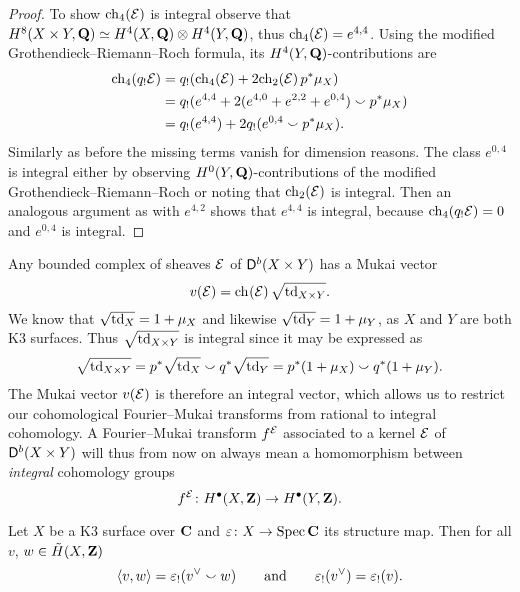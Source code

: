 \begin{proof}
    To show $\ch[4]{\E}$ is integral observe that $H^8(X \times Y, \mathbf Q) \simeq H^4(X, \mathbf Q) \otimes H^4(Y, \mathbf Q)$, thus $\ch[4]{\E} = e^{4,4}$. Using the modified Grothendieck--Riemann--Roch formula, its $H^4(Y, \mathbf Q)$-contributions are
    \begin{align*}
        \ch[4]{q_!\E} &= q_!(\ch[4]{\E} + 2\ch[2]{\E}p^*\mu_X) \\
        &= q_!(e^{4,4} + 2(e^{4,0} + e^{2,2} + e^{0,4})\smallsmile p^*\mu_X) \\
        &= q_!(e^{4,4}) + 2q_!(e^{0,4} \smallsmile p^*\mu_X).
    \end{align*}
    Similarly as before the missing terms vanish for dimension reasons. The class $e^{0,4}$ is integral either by observing $H^0(Y, \mathbf Q)$-contributions of the modified Grothendieck--Riemann--Roch or noting that $\ch[2]{\E}$ is integral. Then an analogous argument as with $e^{4,2}$ shows that $e^{4,4}$ is integral, because $\ch[4]{q_!\E} = 0$ and $e^{0,4}$ is integral. 
\end{proof}

\begin{remark}
    \label{Remark for rational to integral fm restriction}
    Any bounded complex of sheaves $\mathcal E$ of $\mathsf{D}^b(X \times Y)$ has a Mukai vector
    \[
        v(\E) = \ch[]{\E}\sqrt{\tdclass{X \times Y}}.
    \]
    We know that $\sqrt{\operatorname{td}_{X}} = 1 + \mu_X$ and likewise $\sqrt{\operatorname{td}_{Y}} = 1 + \mu_Y$, as $X$ and $Y$ are both K3 surfaces. Thus $\sqrt{\operatorname{td}_{X \times Y}}$ is integral since it may be expressed as
    \[
        \sqrt{\operatorname{td}_{X \times Y}} = p^*\sqrt{\operatorname{td}_{X}} \smallsmile q^*\sqrt{\operatorname{td}_{Y}} = p^*(1 + \mu_X) \smallsmile q^*(1 + \mu_Y).
    \]
    The Mukai vector $v(\mathcal E)$ is therefore an integral vector, which allows us to restrict our cohomological Fourier--Mukai transforms from rational to integral cohomology. A Fourier--Mukai transform $f^{\mathcal E}$ associated to a kernel $\mathcal E$ of $\mathsf{D}^b(X \times Y)$ will thus from now on always mean a homomorphism between \emph{integral} cohomology groups
    \[
        f^{\mathcal E} \colon H^{\bullet}(X, \mathbf Z) \to H^{\bullet}(Y, \mathbf Z).
    \] 
\end{remark}

\begin{lemma}
    \label{Intersection pairing through push-forward of structure map}
    Let $X$ be a K3 surface over $\mathbf C$ and $\varepsilon \colon X \to \operatorname{Spec}\mathbf C$ its structure map. Then for all $v$, $w \in \,\tilde{\!{H}}(X, \mathbf Z)$
    \[
        \langle v, w \rangle = \varepsilon_!(v^\vee \smallsmile w) \qquad \text{and} \qquad \varepsilon_!(v^\vee) = \varepsilon_!(v). 
    \] 
\end{lemma}

